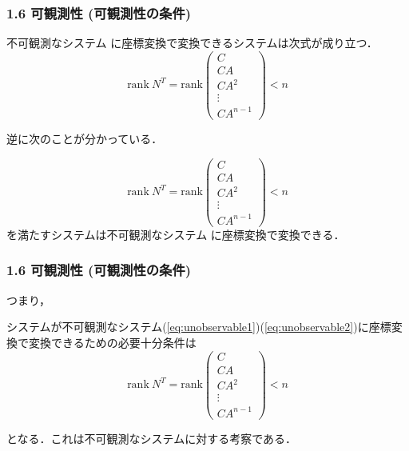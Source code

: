 \begin{frame}[t]
\frametitle{1.6 可観測性 (可観測性の条件)}
\begin{block}{}
不可観測なシステム
に座標変換で変換できるシステムは次式が成り立つ．\\
   $$\mbox{rank}\ N^T
   = \mbox{rank}
    \left(\begin{array}{c}
           C        \\
     C A      \\
     C A^2    \\
     \vdots   \\
     C A^{n-1}
    \end{array}\right)
    < n$$
\end{block}
逆に次のことが分かっている．
\begin{block}{}
   $$\mbox{rank}\ N^T
   = \mbox{rank}
    \left(\begin{array}{c}
           C        \\
     C A      \\
     C A^2    \\
     \vdots   \\
     C A^{n-1}
    \end{array}\right)
    < n$$
    を満たすシステムは不可観測なシステム
    に座標変換で変換できる．
\end{block}
\end{frame}


\begin{frame}[t]
\frametitle{1.6 可観測性 (可観測性の条件)}
つまり，
\begin{block}{}
システムが不可観測なシステム(\ref{eq:unobservable1})(\ref{eq:unobservable2})に座標変換で変換できるための必要十分条件は
   $$\mbox{rank}\ N^T
   = \mbox{rank}
    \left(\begin{array}{c}
           C        \\
     C A      \\
     C A^2    \\
     \vdots   \\
     C A^{n-1}
    \end{array}\right)
    < n$$
\end{block}
となる．これは不可観測なシステムに対する考察である．
\end{frame}


